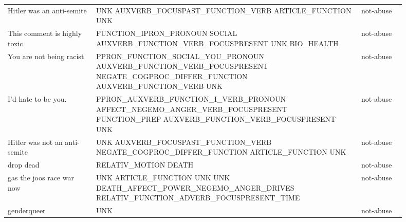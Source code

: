 \begin{longtable}[c]{p{0.2\linewidth} p{0.6\linewidth} p{0.1\linewidth}}
Hitler was an anti-semite                             & UNK AUXVERB\_FOCUSPAST\_FUNCTION\_VERB ARTICLE\_FUNCTION UNK                                                                                                                                                         & not-abuse  \\
This comment is highly toxic                          & FUNCTION\_IPRON\_PRONOUN SOCIAL AUXVERB\_FUNCTION\_VERB\_FOCUSPRESENT UNK BIO\_HEALTH                                                                                                                                  & not-abuse  \\
You are not being racist                              & PPRON\_FUNCTION\_SOCIAL\_YOU\_PRONOUN AUXVERB\_FUNCTION\_VERB\_FOCUSPRESENT NEGATE\_COGPROC\_DIFFER\_FUNCTION AUXVERB\_FUNCTION\_VERB UNK                                                                                    & not-abuse  \\
I'd hate to be you.                                   & PPRON\_AUXVERB\_FUNCTION\_I\_VERB\_PRONOUN AFFECT\_NEGEMO\_ANGER\_VERB\_FOCUSPRESENT FUNCTION\_PREP AUXVERB\_FUNCTION\_VERB\_FOCUSPRESENT UNK                                                                                 & not-abuse  \\
Hitler was not an anti-semite                         & UNK AUXVERB\_FOCUSPAST\_FUNCTION\_VERB NEGATE\_COGPROC\_DIFFER\_FUNCTION ARTICLE\_FUNCTION UNK                                                                                                                          & not-abuse  \\
drop dead                                             & RELATIV\_MOTION DEATH                                                                                                                                                                                             & not-abuse  \\
gas the joos race war now                             & UNK ARTICLE\_FUNCTION UNK UNK DEATH\_AFFECT\_POWER\_NEGEMO\_ANGER\_DRIVES RELATIV\_FUNCTION\_ADVERB\_FOCUSPRESENT\_TIME                                                                                                    & not-abuse  \\
genderqueer                                           & UNK                                                                                                                                                                                                              & not-abuse  \\

\end{longtable}
